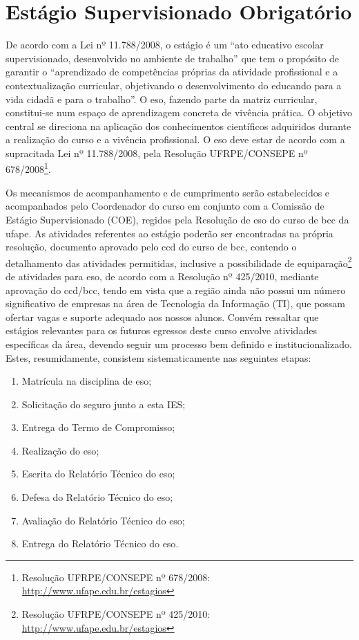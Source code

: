 \documentclass[
	12pt,				%
	openright,			%
  oneside,     %
	a4paper,			%
 hyphens,
	chapter=TITLE,		%
	english,			%
	french,				%
	spanish,			%
	brazil				%
	]{abntex2}
\begin{document}
\chapter{Estágio Supervisionado Obrigatório}
\label{cap_eso}

De acordo com a Lei nº 11.788/2008, o estágio é um ``ato educativo escolar supervisionado, desenvolvido no ambiente de trabalho'' que tem o propósito de garantir o ``aprendizado de competências próprias da atividade profissional e a contextualização curricular, objetivando o desenvolvimento do educando para a vida cidadã e para o trabalho''. O \acrfull{eso}, fazendo parte da matriz curricular, constitui-se num espaço de aprendizagem concreta de vivência prática. O objetivo central se direciona na aplicação dos conhecimentos científicos adquiridos durante a realização do curso e a vivência profissional. O \acrshort{eso} deve estar de acordo com a supracitada Lei nº 11.788/2008, pela Resolução UFRPE/CONSEPE nº 678/2008\footnote{Resolução UFRPE/CONSEPE nº 678/2008: \url{http://www.ufape.edu.br/estagios}}.

Os mecanismos de acompanhamento e de cumprimento serão estabelecidos e acompanhados pelo Coordenador do curso em conjunto com a Comissão de Estágio Supervisionado (COE), regidos pela Resolução de \acrshort{eso} do curso de \acrshort{bcc} da \acrshort{ufape}. As atividades referentes ao estágio poderão ser encontradas na própria resolução, documento aprovado pelo \acrshort{ccd} do curso de \acrshort{bcc}, contendo o detalhamento das atividades permitidas, inclusive a possibilidade de equiparação\footnote{Resolução UFRPE/CONSEPE nº 425/2010: \url{http://www.ufape.edu.br/estagios}} de atividades para \acrshort{eso}, de acordo com a Resolução nº 425/2010, mediante aprovação do \acrshort{ccd}/\acrshort{bcc}, tendo em vista que a região ainda não possui um número significativo de empresas na área de Tecnologia da Informação (TI), que possam ofertar vagas e suporte adequado aos nossos alunos. Convém ressaltar que estágios relevantes para os futuros egressos deste curso envolve atividades específicas da área, devendo seguir um processo bem definido e institucionalizado. Estes, resumidamente, consistem sistematicamente nas seguintes etapas:

\begin{enumerate}
    \item Matrícula na disciplina de \acrshort{eso};
    \item Solicitação do seguro junto a esta IES;
    \item Entrega do Termo de Compromisso;
    \item Realização do \acrshort{eso};
    \item Escrita do Relatório Técnico do \acrshort{eso};
    \item Defesa do Relatório Técnico do \acrshort{eso};
    \item Avaliação do Relatório Técnico do \acrshort{eso};
    \item Entrega do Relatório Técnico do \acrshort{eso}.
\end{enumerate}
\end{document}
